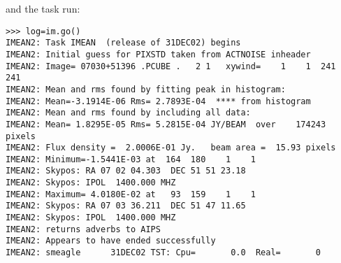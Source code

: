 \documentclass[11pt]{report}
\begin{document}
and the task run:
\begin{verbatim}
>>> log=im.go()
IMEAN2: Task IMEAN  (release of 31DEC02) begins
IMEAN2: Initial guess for PIXSTD taken from ACTNOISE inheader
IMEAN2: Image= 07030+51396 .PCUBE .   2 1   xywind=    1    1  241  241
IMEAN2: Mean and rms found by fitting peak in histogram:
IMEAN2: Mean=-3.1914E-06 Rms= 2.7893E-04  **** from histogram
IMEAN2: Mean and rms found by including all data:
IMEAN2: Mean= 1.8295E-05 Rms= 5.2815E-04 JY/BEAM  over    174243 pixels
IMEAN2: Flux density =  2.0006E-01 Jy.   beam area =  15.93 pixels
IMEAN2: Minimum=-1.5441E-03 at  164  180    1    1
IMEAN2: Skypos: RA 07 02 04.303  DEC 51 51 23.18
IMEAN2: Skypos: IPOL  1400.000 MHZ
IMEAN2: Maximum= 4.0180E-02 at   93  159    1    1
IMEAN2: Skypos: RA 07 03 36.211  DEC 51 47 11.65
IMEAN2: Skypos: IPOL  1400.000 MHZ
IMEAN2: returns adverbs to AIPS
IMEAN2: Appears to have ended successfully
IMEAN2: smeagle      31DEC02 TST: Cpu=       0.0  Real=       0
\end{verbatim}
\end{document}
